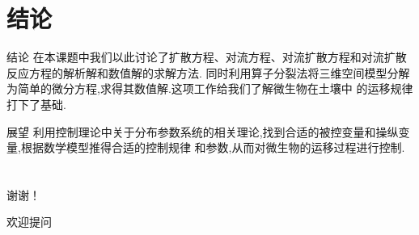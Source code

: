 \documentclass[xcolor=svgnames]{beamer} %
\begin{document}
\section{结论}
\begin{frame}{结论}
在本课题中我们以此讨论了扩散方程、对流方程、对流扩散方程和对流扩散反应方程的解析解和数值解的求解方法.
同时利用算子分裂法将三维空间模型分解为简单的微分方程,求得其数值解.这项工作给我们了解微生物在土壤中
的运移规律打下了基础.\par
\end{frame}
\begin{frame}{展望}
利用控制理论中关于分布参数系统的相关理论,找到合适的被控变量和操纵变量,根据数学模型推得合适的控制规律
和参数,从而对微生物的运移过程进行控制.
\end{frame}
	\section*{}
	\begin{frame}
	\begin{center}
	\Large
	谢谢！\par
	欢迎提问
	\end{center}
	\end{frame}
\end{document}
